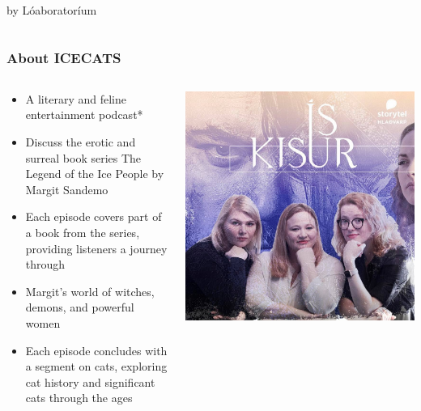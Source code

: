 \documentclass{beamer}
\begin{document}
\begin{frame}
\begin{columns}[T]
\begin{column}{0.45\textwidth}
                \vfill
                by L\'{o}aborator\'{i}um
            \end{column}
        \end{columns}
    \end{frame}

    \begin{frame}
        \frametitle{About ICECATS}
        \begin{columns}[T]
            \begin{column}{0.55\textwidth}
                \begin{itemize}
                    \item A literary and feline entertainment podcast*
                    \item Discuss the erotic and surreal book series The Legend of the Ice People by Margit Sandemo
                    \item Each episode covers part of a book from the series, providing listeners a journey through
                    \item Margit's
                    world of witches, demons, and powerful women
                    \item Each episode concludes with a segment on cats, exploring cat history and significant
                    cats through the ages
                \end{itemize}
            \end{column}
            \begin{column}{0.45\textwidth}
                \centering
                \includegraphics[width=\textwidth]{figures/podcast_image.jpg}

\end{column}
\end{columns}
\end{frame}
\end{document}
